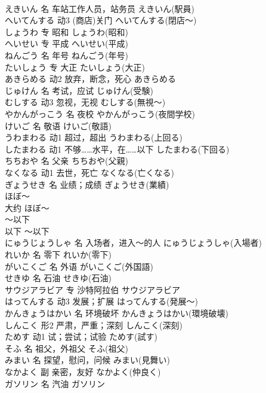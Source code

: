 \documentclass[8pt]{extreport}
\begin{document}
\begin{CJK}{UTF8}{min}
\\	えきいん	名	车站工作人员，站务员	えきいん(駅員)	
\\	へいてんする	动3	(商店)关门	へいてんする(閉店～)	
\\	しょうわ	专	昭和	しょうわ(昭和)	
\\	へいせい	专	平成	へいせい(平成)	
\\	ねんごう	名	年号	ねんごう(年号)	
\\	たいしょう	专	大正	たいしょう(大正)	
\\	あきらめる	动2	放弃，断念，死心	あきらめる	
\\	じゅけん	名	考试，应试	じゅけん(受験)	
\\	むしする	动3	忽视，无视	むしする(無視～)	
\\	やかんがっこう	名	夜校	やかんがっこう(夜間学校)	
\\	けいご	名	敬语	けいご(敬語)	
\\	うわまわる	动1	超过，超出	うわまわる(上回る)	
\\	したまわる	动1	不够……水平，在……以下	したまわる(下回る)	
\\	ちちおや	名	父亲	ちちおや(父親)	
\\	なくなる	动1	去世，死亡	なくなる(亡くなる)	
\\	ぎょうせき	名	业绩；成绩	ぎょうせき(業績)	
\\	ほぼ～	
\\	大约	ほぼ～	
\\	～以下	
\\	以下	～以下	
\\	にゅうじょうしゃ	名	入场者，进入～的人	にゅうじょうしゃ(入場者)	
\\	れいか	名	零下	れいか(零下)	
\\	がいこくご	名	外语	がいこくご(外国語)	
\\	せきゆ	名	石油	せきゆ(石油)	
\\	サウジアラビア	专	沙特阿拉伯	サウジアラビア	
\\	はってんする	动3	发展；扩展	はってんする(発展～)	
\\	かんきょうはかい	名	环境破坏	かんきょうはかい(環境破壊)	
\\	しんこく	形2	严肃，严重；深刻	しんこく(深刻)	
\\	ためす	动1	试；尝试；试验	ためす(試す)	
\\	そふ	名	祖父，外祖父	そふ(祖父)	
\\	みまい	名	探望，慰问，问候	みまい(見舞い)	
\\	なかよく	副	亲密，友好	なかよく(仲良く)	
\\	ガソリン	名	汽油	ガソリン	

\end{CJK}
\end{document}
